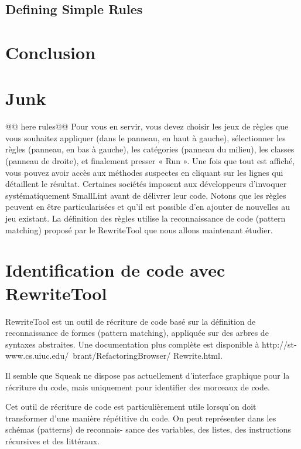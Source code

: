 \documentclass[a4paper,10pt,twoside]{book}
\begin{document}
\subsection{Defining Simple Rules}

\section{Conclusion}






\section{Junk}

@@ here rules@@
 Pour vous en servir,
vous devez choisir les jeux de r\`egles que vous souhaitez appliquer
(dans le panneau, en haut à gauche), s\'electionner les r\`egles (panneau,
en bas à gauche), les cat\'egories (panneau du milieu), les classes
(panneau de droite), et finalement presser « Run ». Une fois que tout
est affich\'e, vous pouvez avoir acc\`es aux m\'ethodes suspectes en
cliquant sur les lignes qui d\'etaillent le r\'esultat.  Certaines
soci\'et\'es imposent aux d\'eveloppeurs d'invoquer syst\'ematiquement
SmallLint avant de d\'elivrer leur code. Notons que les r\`egles peuvent
en être particularis\'ees et qu'il est possible d'en ajouter de
nouvelles au jeu existant. La d\'efinition des r\`egles utilise la
reconnaissance de code (pattern matching) propos\'e par le RewriteTool
que nous allons maintenant \'etudier.

\section{Identification de code avec RewriteTool}

RewriteTool est un outil de r\'ecriture de code bas\'e sur la d\'efinition
de reconnaissance de formes (pattern matching), appliqu\'ee sur des
arbres de syntaxes abstraites. Une documentation plus compl\`ete est
disponible à http://st-www.cs.uiuc.edu/~brant/RefactoringBrowser/
Rewrite.html.

Il semble que Squeak ne dispose pas actuellement d'interface graphique
pour la r\'ecriture du code, mais uniquement pour identifier des
morceaux de code.


Cet outil de r\'ecriture de code est particuli\`erement utile lorsqu'on
doit transformer d'une mani\`ere r\'ep\'etitive du code. On peut repr\'esenter
dans les sch\'emas (patterns) de reconnais- sance des variables, des
listes, des instructions r\'ecursives et des litt\'eraux.
\end{document}
